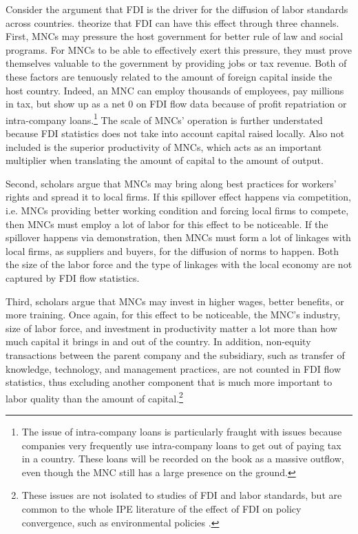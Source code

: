 Consider the argument that FDI is the driver for the diffusion of labor
standards across countries. \citet{Mosley2007} theorize that FDI can have this
effect through three channels. First, MNCs may pressure the host government for
better rule of law and social programs. For MNCs to be able to effectively exert
this pressure, they must prove themselves valuable to the government by
providing jobs or tax revenue. Both of these factors are tenuously related to
the amount of foreign capital inside the host country. Indeed, an MNC can employ
thousands of employees, pay millions in tax, but show up as a net 0 on FDI flow
data because of profit repatriation or intra-company loans.\footnote{The issue
  of intra-company loans is particularly fraught with issues because companies
  very frequently use intra-company loans to get out of paying tax in a country.
  These loans will be recorded on the book as a massive outflow, even though the
  MNC still has a large presence on the ground.} The scale of MNCs' operation is
further understated because FDI statistics does not take into account capital
raised locally. Also not included is the superior productivity of MNCs, which
acts as an important multiplier when translating the amount of capital to the
amount of output.

Second, scholars argue that MNCs may bring along best practices for workers'
rights and spread it to local firms. If this spillover effect happens via
competition, i.e. MNCs providing better working condition and forcing local
firms to compete, then MNCs must employ a lot of labor for this effect to be
noticeable. If the spillover happens via demonstration, then MNCs must form a
lot of linkages with local firms, as suppliers and buyers, for the diffusion of
norms to happen. Both the size of the labor force and the type of linkages with
the local economy are not captured by FDI flow statistics.

Third, scholars argue that MNCs may invest in higher wages, better benefits, or
more training. Once again, for this effect to be noticeable, the MNC's industry,
size of labor force, and investment in productivity matter a lot more than how
much capital it brings in and out of the country. In addition, non-equity
transactions between the parent company and the subsidiary, such as transfer of
knowledge, technology, and management practices, are not counted in FDI flow
statistics, thus excluding another component that is much more
important to labor quality than the amount of capital.\footnote{These issues are
  not isolated to studies of FDI and labor standards, but are common to the
  whole IPE literature of the effect of FDI on policy convergence, such as
  environmental policies \citep{Prakash2007}.}


